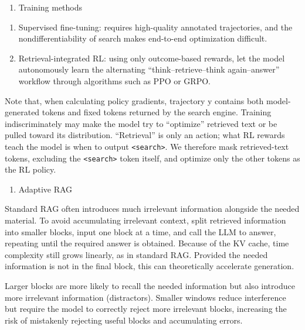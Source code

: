 \begin{enumerate}
\def\labelenumi{\arabic{enumi}.}
\setcounter{enumi}{1}
\tightlist
\item
  Training methods
\end{enumerate}

\begin{enumerate}
\def\labelenumi{(\arabic{enumi})}
\item
  Supervised fine-tuning: requires high-quality annotated trajectories, and the nondifferentiability of search makes end-to-end optimization difficult.
\item
  Retrieval-integrated RL: using only outcome-based rewards, let the model autonomously learn the alternating ``think--retrieve--think again--answer'' workflow through algorithms such as PPO or GRPO.
\end{enumerate}

Note that, when calculating policy gradients, trajectory y contains both model-generated tokens and fixed tokens returned by the search engine. Training indiscriminately may make the model try to ``optimize'' retrieved text or be pulled toward its distribution. ``Retrieval'' is only an action; what RL rewards teach the model is when to output \texttt{\textless{}search\textgreater{}}. We therefore mask retrieved-text tokens, excluding the \texttt{\textless{}search\textgreater{}} token itself, and optimize only the other tokens as the RL policy.

\begin{enumerate}
\def\labelenumi{(\Roman{enumi})}
\setcounter{enumi}{2}
\tightlist
\item
  Adaptive RAG
\end{enumerate}

Standard RAG often introduces much irrelevant information alongside the needed material. To avoid accumulating irrelevant context, split retrieved information into smaller blocks, input one block at a time, and call the LLM to answer, repeating until the required answer is obtained. Because of the KV cache, time complexity still grows linearly, as in standard RAG. Provided the needed information is not in the final block, this can theoretically accelerate generation.

Larger blocks are more likely to recall the needed information but also introduce more irrelevant information (distractors). Smaller windows reduce interference but require the model to correctly reject more irrelevant blocks, increasing the risk of mistakenly rejecting useful blocks and accumulating errors.

